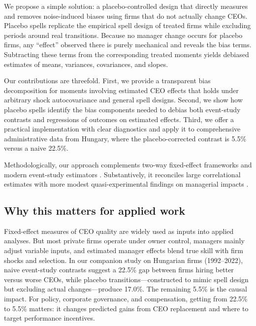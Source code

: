 \documentclass[11pt,a4paper]{article}
\begin{document}
We propose a simple solution: a placebo-controlled design that directly measures and removes noise-induced biases using firms that do not actually change CEOs. Placebo spells replicate the empirical spell design of treated firms while excluding periods around real transitions. Because no manager change occurs for placebo firms, any ``effect'' observed there is purely mechanical and reveals the bias terms. Subtracting these terms from the corresponding treated moments yields debiased estimates of means, variances, covariances, and slopes.

Our contributions are threefold. First, we provide a transparent bias decomposition for moments involving estimated CEO effects that holds under arbitrary shock autocovariance and general spell designs. Second, we show how placebo spells identify the bias components needed to debias both event-study contrasts and regressions of outcomes on estimated effects. Third, we offer a practical implementation with clear diagnostics and apply it to comprehensive administrative data from Hungary, where the placebo-corrected contrast is 5.5\% versus a naive 22.5\%.

Methodologically, our approach complements two-way fixed-effect frameworks \citep{Abowd1999Econometrica,Card2018JoLE} and modern event-study estimators \citep{Callaway2021JoLE}. Substantively, it reconciles large correlational estimates with more modest quasi-experimental findings on managerial impacts \citep{bennedsen2020ceos}.

\subsection*{Why this matters for applied work}
Fixed-effect measures of CEO quality are widely used as inputs into applied analyses. But most private firms operate under owner control, managers mainly adjust variable inputs, and estimated manager effects blend true skill with firm shocks and selection. In our companion study on Hungarian firms (1992--2022), naive event-study contrasts suggest a 22.5\% gap between firms hiring better versus worse CEOs, while placebo transitions---constructed to mimic spell design but excluding actual changes---produce 17.0\%. The remaining 5.5\% is the causal impact. For policy, corporate governance, and compensation, getting from 22.5\% to 5.5\% matters: it changes predicted gains from CEO replacement and where to target performance incentives.
\end{document}
